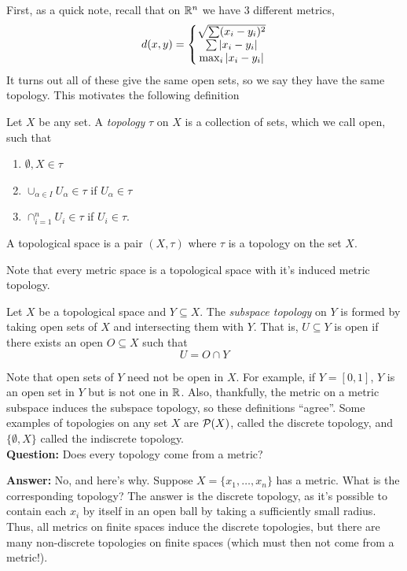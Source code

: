 
First, as a quick note, recall that on $\R^n$ we have $3$ different metrics,
\[ d(x, y) = \left\{\begin{matrix} \sqrt{\sum (x_i - y_i)^2} \\ \sum \abs{x_i - y_i} \\ \max_{i} \abs{x_i - y_i}\end{matrix}\right. \]
It turns out all of these give the same open sets, so we say they have the same topology. This motivates the following definition

\begin{definition}
    Let $X$ be any set. A \emph{topology} $\tau$ on $X$ is a collection of sets, which we call open, such that
    \begin{enumerate}
        \item $\emptyset, X \in \tau$
        \item $\cup_{\alpha \in I} U_{\alpha} \in \tau$ if $U_{\alpha} \in \tau$
        \item $\cap_{i = 1}^{n} U_{i} \in \tau$ if $U_{i} \in \tau$.
    \end{enumerate}
    A topological space is a pair $(X, \tau)$ where $\tau$ is a topology on the set $X$.
\end{definition}

Note that every metric space is a topological space with it's induced metric topology.

\begin{definition}
    Let $X$ be a topological space and $Y \subseteq X$. The \emph{subspace topology} on $Y$ is formed by taking open sets of $X$ and intersecting them with $Y$. That is, $U \subseteq Y$ is open if there exists an open $O \subseteq X$ such that
    \[ U = O \cap Y \]
\end{definition}
Note that open sets of $Y$ need not be open in $X$. For example, if $Y = [0, 1]$, $Y$ is an open set in $Y$ but is not one in $\R$. Also, thankfully, the metric on a metric subspace induces the subspace topology, so these definitions ``agree''. Some examples of topologies on any set $X$ are $\P(X)$, called the discrete topology, and $\{\emptyset, X\}$ called the indiscrete topology.\\

\textbf{Question:} Does every topology come from a metric?

\textbf{Answer:} No, and here's why. Suppose $X = \{x_1, \ldots, x_n\}$ has a metric. What is the corresponding topology? The answer is the discrete topology, as it's possible to contain each $x_i$ by itself in an open ball by taking a sufficiently small radius. Thus, all metrics on finite spaces induce the discrete topologies, but there are many non-discrete topologies on finite spaces (which must then not come from a metric!).\\


